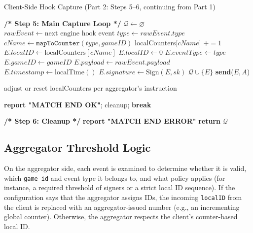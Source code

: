 \documentclass[11pt]{article}
\begin{document}
\begin{algorithm}[H]
\scriptsize
\caption{Client-Side Hook Capture (Part 2: Steps 5--6, continuing from Part 1)}
\label{algo:clientHookCapture-part2}
\begin{algorithmic}[1]
  \State \textbf{/* Step 5: Main Capture Loop */}
  \State $\mathcal{Q} \gets \varnothing$
    \State $rawEvent \gets \text{next engine hook event}$
    \State $type \gets rawEvent.type$ 
      \State $cName \gets \texttt{mapToCounter}(type, gameID)$
      \State localCounters[$cName$] $\mathrel{+}= 1$
      \State $E.localID \gets \text{localCounters}[cName]$
    \Else
      \State $E.localID \gets 0$ 
    \EndIf
    \State $E.eventType \gets type$
    \State $E.gameID \gets gameID$
    \State $E.payload \gets rawEvent.payload$
    \State $E.timestamp \gets \text{localTime}()$
    \State $E.signature \gets \text{Sign}(E, sk)$
    \State $\mathcal{Q} \cup \{E\}$
    \State \textbf{send}($E,A$)

      \State adjust or reset localCounters per aggregator’s instruction
    \EndIf

      \State \textbf{report "MATCH END OK"}; cleanup; \textbf{break}
    \EndIf
  \EndWhile

  \State \textbf{/* Step 6: Cleanup */}
    \State \textbf{report "MATCH END ERROR"}
  \EndIf
  \State \textbf{return} $\mathcal{Q}$
\EndProcedure
\end{algorithmic}
\end{algorithm}



\subsection{Aggregator Threshold Logic}
\label{sec:aggregatorThresholdSubsec}

On the aggregator side, each event is examined to determine whether it is valid, which \texttt{game\_id} and event type it belongs to, and what policy applies (for instance, a required threshold of signers or a strict local ID sequence). If the configuration says that the aggregator assigns IDs, the incoming \texttt{localID} from the client is replaced with an aggregator-issued number (e.g., an incrementing global counter). Otherwise, the aggregator respects the client’s counter-based local ID.
\end{document}
